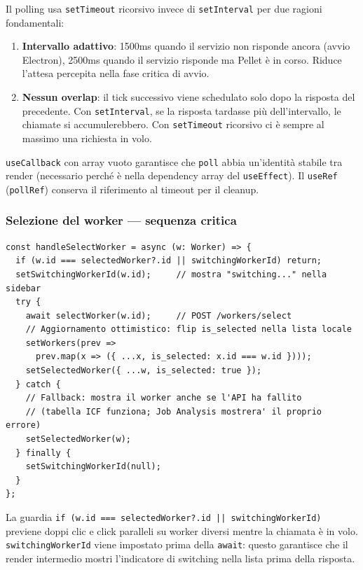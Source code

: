 \documentclass[a4paper,12pt]{article}
\begin{document}
\noindent Il polling usa \texttt{setTimeout} ricorsivo invece di
\texttt{setInterval} per due ragioni fondamentali:
\begin{enumerate}
  \item \textbf{Intervallo adattivo}: 1500ms quando il servizio non risponde
        ancora (avvio Electron), 2500ms quando il servizio risponde ma
        Pellet \`{e} in corso. Riduce l'attesa percepita nella fase critica
        di avvio.
  \item \textbf{Nessun overlap}: il tick successivo viene schedulato solo
        dopo la risposta del precedente. Con \texttt{setInterval}, se
        la risposta tardasse pi\`{u} dell'intervallo, le chiamate si
        accumulerebbero. Con \texttt{setTimeout} ricorsivo ci \`{e} sempre
        al massimo una richiesta in volo.
\end{enumerate}
\texttt{useCallback} con array vuoto garantisce che \texttt{poll}
abbia un'identit\`{a} stabile tra render (necessario perch\'{e}
\`{e} nella dependency array del \texttt{useEffect}). Il \texttt{useRef}
(\texttt{pollRef}) conserva il riferimento al timeout per il cleanup.

\subsubsection{Selezione del worker --- sequenza critica}
\vspace{2pt}
\begin{lstlisting}
const handleSelectWorker = async (w: Worker) => {
  if (w.id === selectedWorker?.id || switchingWorkerId) return;
  setSwitchingWorkerId(w.id);     // mostra "switching..." nella sidebar
  try {
    await selectWorker(w.id);     // POST /workers/select
    // Aggiornamento ottimistico: flip is_selected nella lista locale
    setWorkers(prev =>
      prev.map(x => ({ ...x, is_selected: x.id === w.id })));
    setSelectedWorker({ ...w, is_selected: true });
  } catch {
    // Fallback: mostra il worker anche se l'API ha fallito
    // (tabella ICF funziona; Job Analysis mostrera' il proprio errore)
    setSelectedWorker(w);
  } finally {
    setSwitchingWorkerId(null);
  }
};
\end{lstlisting}

\noindent La guardia \texttt{if (w.id === selectedWorker?.id || switchingWorkerId)}
previene doppi clic e click paralleli su worker diversi mentre la
chiamata \`{e} in volo. \texttt{switchingWorkerId} viene impostato
prima della \texttt{await}: questo garantisce che il render intermedio
mostri l'indicatore di switching nella lista prima della risposta.
\end{document}
